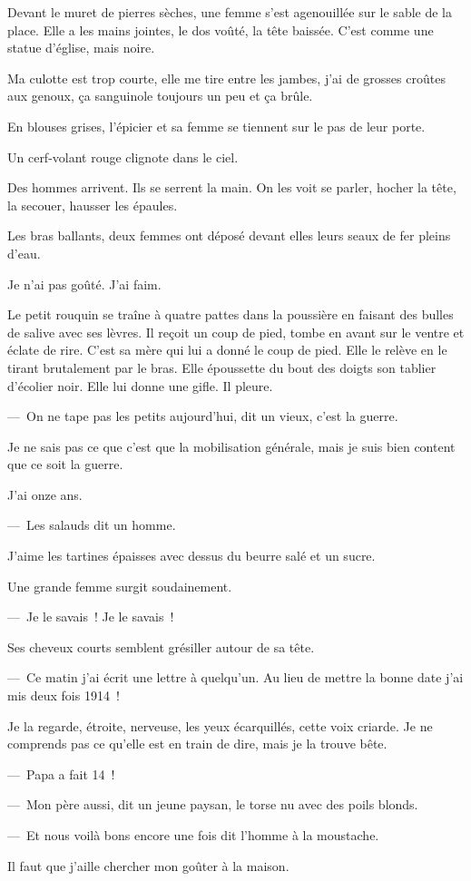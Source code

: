 {Devant le muret de pierres sèches, une femme s'est agenouillée sur le
sable de la place. Elle a les mains jointes, le dos voûté, la tête
baissée. C'est comme une statue d'église, mais noire.

Ma culotte est trop courte, elle me tire entre les jambes, j'ai de
grosses croûtes aux genoux, ça sanguinole toujours un peu et ça
brûle.

En blouses grises, l'épicier et sa femme se tiennent sur le pas de
leur porte.

Un cerf-volant rouge clignote dans le ciel.

Des hommes arrivent. Ils se serrent la main. On les voit se parler,
hocher la tête, la secouer, hausser les épaules.

Les bras ballants, deux femmes ont déposé devant elles leurs seaux de
fer pleins d'eau.

Je n'ai pas goûté. J'ai faim.

Le petit rouquin se traîne à quatre pattes dans la poussière en
faisant des bulles de salive avec ses lèvres. Il reçoit un coup de
pied, tombe en avant sur le ventre et éclate de rire. C'est sa mère
qui lui a donné le coup de pied. Elle le relève en le tirant
brutalement par le bras. Elle époussette du bout des doigts son
tablier d'écolier noir. Elle lui donne une gifle. Il pleure.


\bigskip

—~On ne tape pas les petits aujourd'hui, dit un vieux, c'est la
guerre.


\bigskip

Je ne sais pas ce que c'est que la mobilisation générale, mais je suis
bien content que ce soit la guerre.

J'ai onze ans.


\bigskip

—~Les salauds dit un homme.

J'aime les tartines épaisses avec dessus du beurre salé et un sucre.

Une grande femme surgit soudainement.

—~Je le savais~! Je le savais~!

Ses cheveux courts semblent grésiller autour de sa tête.

—~Ce matin j'ai écrit une lettre à quelqu'un. Au lieu de mettre la
bonne date j'ai mis deux fois 1914~!

Je la regarde, étroite, nerveuse, les yeux écarquillés, cette voix
criarde. Je ne comprends pas ce qu'elle est en train de dire, mais je
la trouve bête.

—~Papa a fait 14~!

—~Mon père aussi, dit un jeune paysan, le torse nu avec des poils
blonds.

—~Et nous voilà bons encore une fois dit l'homme à la moustache.

Il faut que j'aille chercher mon goûter à la maison.
}

